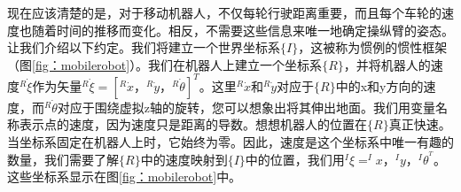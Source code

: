 
现在应该清楚的是，对于移动机器人，不仅每轮行驶距离重要，而且每个车轮的速度也随着时间的推移而变化。相反，不需要这些信息来唯一地确定操纵臂的姿态。让我们介绍以下约定。我们将建立一个世界坐标系$ \{I \} $，这被称为惯例的惯性框架（图\ref {fig：mobilerobot}）。我们在机器人上建立一个坐标系$ \{R \} $，并将机器人的速度$ ^ R \dot {\xi} $作为矢量$ ^ R \dot {\xi} = [^ R \dot {x }，^ R \dot {y}，^ R \dot {\theta}] ^ T $。这里$ ^ R \dot {x} $和$ ^ R \dot {y} $对应于$ \{R \} $中的x和y方向的速度，而$ ^ R \dot {\theta} $对应于围绕虚拟z轴的旋转，您可以想象出将其伸出地面。我们用变量名称表示点的速度，因为速度只是距离的导数。想想机器人的位置在$ \{R \} $真正快速。当坐标系固定在机器人上时，它始终为零。因此，速度是这个坐标系中唯一有趣的数量，我们需要了解$ \{R \} $中的速度映射到$ \{I \} $中的位置，我们用$ ^ I \xi = ^ Ix，^ Iy，^ I \theta ^ ^ T $。这些坐标系显示在图\ref {fig：mobilerobot}中。


